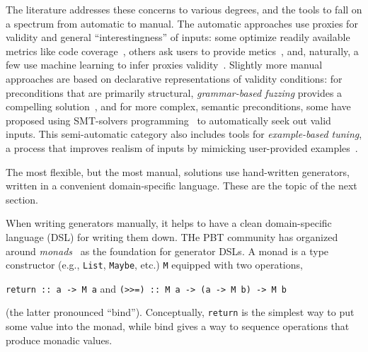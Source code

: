 The literature addresses these concerns to various degrees, and the tools to
fall on a spectrum from automatic to manual. The automatic approaches use
proxies for validity and general ``interestingness'' of inputs: some optimize
readily available metrics like code coverage~\cite{afl-readme}, others ask users
to provide metics~\cite{loscher2017targetedpbt}, and, naturally, a few use
machine learning to infer proxies validity~\cite{godefroid2017learn,
DBLP:conf/icse/ReddyLPS20}. Slightly more manual approaches are based on
declarative representations of validity conditions: for preconditions that are
primarily structural, {\em grammar-based fuzzing} provides a compelling
solution~\cite{godefroid2008grammar, holler2012fuzzing, veggalam2016ifuzzer,
wang2019superion, srivastava2021gramatron}, and for more complex, semantic
preconditions, some have proposed using SMT-solvers
programming~\cite{dewey2017automated, LuckPOPL, steinhofel2022input} to
automatically seek out valid inputs. This semi-automatic category also includes
tools for {\em example-based tuning}, a process that improves realism of inputs
by mimicking user-provided examples~\cite{soremekun2020inputs}.

The most flexible, but the most manual, solutions use hand-written generators,
written in a convenient domain-specific language. These are the topic of the
next section.

%
When writing generators manually, it helps to have a clean domain-specific
language (DSL) for writing them down. THe PBT community has organized around
{\em monads\/}~\cite{moggi1991notions} as the foundation for generator DSLs. A
monad is a type constructor (e.g., \lstinline{List}, \lstinline{Maybe}, etc.)
\lstinline{M} equipped with two operations,
\begin{center}
  \lstinline{return :: a -> M a} \qquad and \qquad \lstinline{(>>=) :: M a -> (a -> M b) -> M b}
\end{center}
(the latter pronounced ``bind''). Conceptually, \lstinline{return} is the
simplest way to put some value into the monad, while bind gives a way to
sequence operations that produce monadic values.


